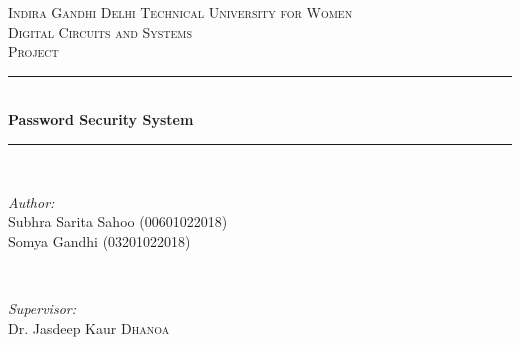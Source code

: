\documentclass{article}
\begin{document}
\begin{titlepage}

\newcommand{\HRule}{\rule{\linewidth}{0.5mm}} %

\center %
 

\textsc{\LARGE Indira Gandhi Delhi Technical University for Women}\\[1.5cm] %
\textsc{\Large Digital Circuits and Systems}\\[0.5cm] %
\textsc{\large Project}\\[0.5cm] %


\HRule \\[0.4cm]
{ \huge \bfseries Password Security System}\\[0.4cm] %
\HRule \\[1.5cm]
 

\begin{minipage}{0.4\textwidth}
\begin{flushleft} \large
\emph{Author:}\\
Subhra Sarita Sahoo \textsc{(00601022018)}\\
Somya Gandhi \textsc{(03201022018)} %
\end{flushleft}
\end{minipage}
~
\begin{minipage}{0.4\textwidth}
\begin{flushright} \large
\emph{Supervisor:} \\
Dr. Jasdeep Kaur  \textsc{Dhanoa} %
\end{flushright}
\end{minipage}\\[2cm]


\end{titlepage}
\end{document}
